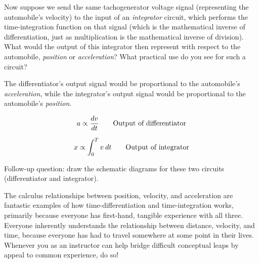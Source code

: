 Now suppose we send the same tachogenerator voltage signal (representing the automobile's velocity) to the input of an {\it integrator} circuit, which performs the time-integration function on that signal (which is the mathematical inverse of differentiation, just as multiplication is the mathematical inverse of division).  What would the output of this integrator then represent with respect to the automobile, {\it position} or {\it acceleration}?  What practical use do you see for such a circuit?







The differentiator's output signal would be proportional to the automobile's {\it acceleration}, while the integrator's output signal would be proportional to the automobile's {\it position}.

$$a \propto {dv \over dt} \hbox{\hskip 20pt Output of differentiator}$$

$$x \propto \int_0^T v \> dt \hbox{\hskip 20pt Output of integrator}$$

\vskip 10pt

Follow-up question: draw the schematic diagrams for these two circuits (differentiator and integrator).







The calculus relationships between position, velocity, and acceleration are fantastic examples of how time-differentiation and time-integration works, primarily because everyone has first-hand, tangible experience with all three.  Everyone inherently understands the relationship between distance, velocity, and time, because everyone has had to travel somewhere at some point in their lives.  Whenever you as an instructor can help bridge difficult conceptual leaps by appeal to common experience, do so!




